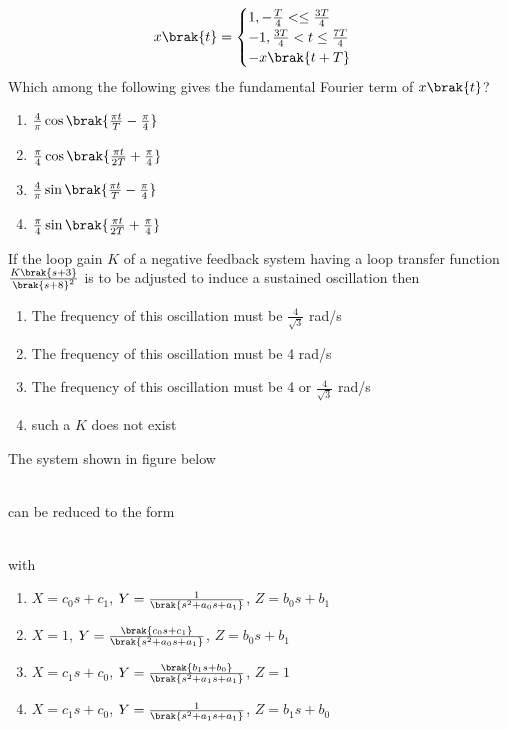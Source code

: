 \begin{align*}
    x\brak{t} = 
    \begin{cases}
        1, -\frac{T}{4} <  \leq \frac{3T}{4} \\
        -1, \frac{3T}{4} < t \leq \frac{7T}{4} \\
        -x\brak{t + T}
    \end{cases}
\end{align*}
Which among the following gives the fundamental Fourier term of $x\brak{t}$? 
\begin{enumerate}
    \item $\frac{4}{\pi}\cos\brak{\frac{\pi t}{T} - \frac{\pi}{4}}$
    \item $\frac{\pi}{4}\cos\brak{\frac{\pi t}{2T} + \frac{\pi}{4}}$
    \item $\frac{4}{\pi}\sin\brak{\frac{\pi t}{T} - \frac{\pi}{4}}$
    \item $\frac{\pi}{4}\sin\brak{\frac{\pi t}{2T} + \frac{\pi}{4}}$ \\
\end{enumerate}
 \item If the loop gain $K$ of a negative feedback system having a loop transfer function $\frac{K\brak{s+3}}{\brak{s+8}^2}$ is to be adjusted to induce a sustained oscillation then
 \begin{enumerate}
     \item The frequency of this oscillation must be $\frac{4}{\sqrt{3}}$ rad/s
     \item The frequency of this oscillation must be 4 rad/s
     \item The frequency of this oscillation must be 4 or $\frac{4}{\sqrt{3}}$ rad/s
     \item such a $K$ does not exist \\
 \end{enumerate}
\item The system shown in figure below
\begin{figure}[!ht]
\centering
\resizebox{0.5\textwidth}{!}{%

}%
\end{figure}\\
can be reduced to the form
\begin{figure}[!ht]
\centering
\resizebox{0.5\textwidth}{!}{%

}%
\end{figure}\\
with
\begin{enumerate}
    \item $X = c_0s + c_1$, $Y = \frac{1}{\brak{s^2 + a_0s + a_1}}$, $Z = b_0s + b_1$
    \item $X = 1$, $Y = \frac{\brak{c_0s + c_1}}{\brak{s^2 + a_0s + a_1}}$, $Z = b_0s + b_1$
    \item $X = c_1s + c_0$, $Y = \frac{\brak{b_1s + b_0}}{\brak{s^2 + a_1s + a_1}}$, $Z = 1$
    \item $X = c_1s + c_0$, $Y = \frac{1}{\brak{s^2 + a_1s + a_1}}$, $Z = b_1s + b_0$ \\
\end{enumerate}
